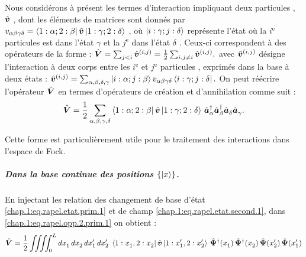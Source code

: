 Nous considérons à présent les termes d’interaction impliquant deux particules , $\hat{\bm{v}}$ , dont les éléments de matrices sont donnés par $v_{\alpha \beta \gamma \delta} = \bra{ 1 : \alpha; 2 : \beta } \hat{\bm{v}}\ket{ 1 : \gamma; 2 : \delta }$ , où $\ket{ i : \gamma; j : \delta }$ représente l'état où la $i^\text{e}$  particules est dans l'état $\gamma$ et la $j^\text{e}$ dans l'état $\delta$  . Ceux-ci correspondent à des opérateurs de la forme :
\(
    \hat{\bm{V}} = \sum_{j < i} \hat{\bm{v}}^{(i, j)} = \frac{1}{2} \sum_{i, j \ne i} \hat{\bm{v}}^{(i, j)}
    \label{eq:V2corps}.
\)
avec $\hat{\bm{v}}^{(i, j)}$ désigne l’interaction à deux corps entre les $i^\text{e}$ et $j^\text{e}$ particules , exprimés dans la base à deux états :
\(
	\hat{\bm{v}}^{(i, j)} = \sum_{\alpha,\beta,\delta,\gamma} \ket{i : \alpha; j : \beta }v_{\alpha \beta \gamma \delta} \bra{ i : \gamma; j : \delta }.
    \label{eq:matriceV}
\)
On peut réécrire l’opérateur \( \hat{\bm{V}} \) en termes d’opérateurs de création et d’annihilation comme suit :
\begin{equation}
    \hat{\bm{V}} = \frac{1}{2} \sum_{\alpha, \beta, \gamma, \delta} \bra{ 1 : \alpha; 2 : \beta } \hat{\bm{v}}\ket{ 1 : \gamma; 2 : \delta } \, \hat{\bm{a}}^\dagger_\alpha \hat{\bm{a}}^\dagger_\beta \hat{\bm{a}}_\delta^{} \hat{\bm{a}}_\gamma^{}.
    \label{chap.1:eq.rapel.opp.2.prim.1}
\end{equation}

Cette forme est particulièrement utile pour le traitement des interactions dans l’espace de Fock.

\subparagraph{Dans la base continue des positions \( \{ \ket{x} \} \).}

En injectant les relation des changement de base d'état
\eqref{chap.1:eq.rapel.etat.prim.1} et de champ \eqref{chap.1:eq.rapel.etat.second.1}, dans \eqref{chap.1:eq.rapel.opp.2.prim.1} on obtient :
\begin{equation}
    \hat{\bm{V}} = \frac{1}{2} \iiiint_0^L dx_1^{} \, dx_2^{} \, dx_1' \, dx_2' \; 
    \bra{ 1 : x_1^{}, 2 : x_2^{} } \hat{\bm{v}} \ket{ 1 : x_1', 2 : x_2' } \,
    \hat{\bm{\Psi}}^\dagger(x_1^{}) \, \hat{\bm{\Psi}}^\dagger(x_2^{}) \, 
    \hat{\bm{\Psi}}(x_2') \, \hat{\bm{\Psi}}(x_1')
    \label{chap.1:eq.rapel.opp.2.second.1}
\end{equation}

